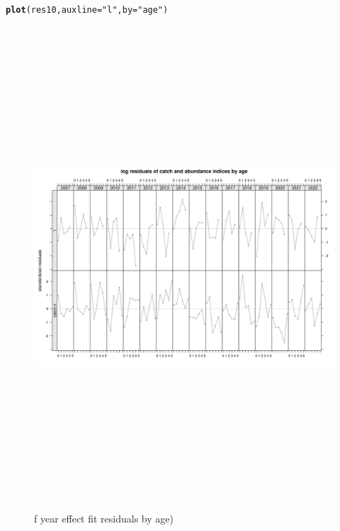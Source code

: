 \documentclass[a4paper,english,11pt]{article}\usepackage[]{graphicx}\usepackage[]{xcolor}
\makeatletter
\newcommand{\hlsng}[1]{\textcolor[rgb]{0.192,0.494,0.8}{#1}}%
\newcommand{\hldef}[1]{\textcolor[rgb]{0.345,0.345,0.345}{#1}}%
\newcommand{\hlkwc}[1]{\textcolor[rgb]{0.333,0.667,0.333}{#1}}%
\newcommand{\hlkwd}[1]{\textcolor[rgb]{0.737,0.353,0.396}{\textbf{#1}}}%
\newenvironment{kframe}{%
 \def\at@end@of@kframe{}%
 \ifinner\ifhmode%
  \def\at@end@of@kframe{\end{minipage}}%
  \begin{minipage}{\columnwidth}%
 \fi\fi%
 \def\FrameCommand##1{\hskip\@totalleftmargin \hskip-\fboxsep
 \colorbox{shadecolor}{##1}\hskip-\fboxsep
     \hskip-\linewidth \hskip-\@totalleftmargin \hskip\columnwidth}%
 \MakeFramed {\advance\hsize-\width
   \@totalleftmargin\z@ \linewidth\hsize
   \@setminipage}}%
 {\par\unskip\endMakeFramed%
 \at@end@of@kframe}
\newenvironment{knitrout}{}{} %
\makeatother
\begin{document}
\begin{knitrout}
\color{fgcolor}\begin{kframe}
\begin{alltt}
\hlkwd{plot}\hldef{(res10,} \hlkwc{auxline} \hldef{=} \hlsng{"l"}\hldef{,} \hlkwc{by} \hldef{=} \hlsng{"age"}\hldef{)}
\end{alltt}
\end{kframe}\begin{figure}[H]

{\centering \includegraphics[width=25cm,height=18cm,angle=90]{figure/vageresbyage-1} 

}

\caption[f year effect fit residuals by age)]{f year effect fit residuals by age)}\label{fig:vageresbyage}
\end{figure}

\end{knitrout}
\end{document}
